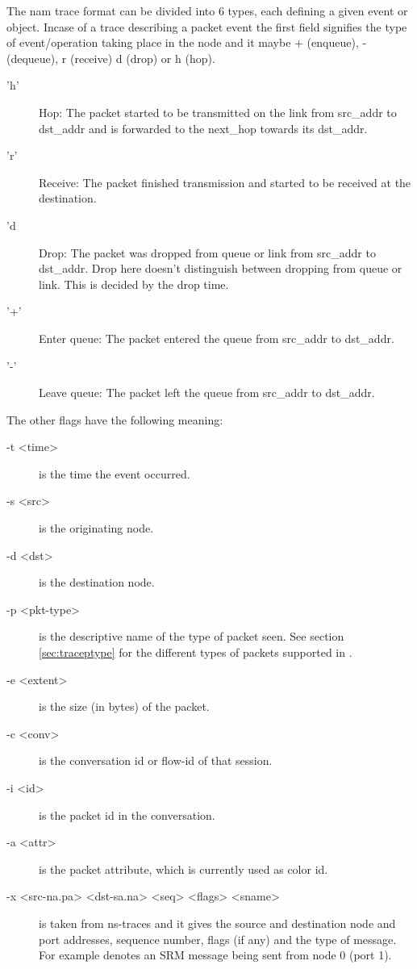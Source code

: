 The nam trace format can be divided into 6 types, each defining a given
event or object. Incase of a trace
describing a packet event the first field signifies the type of
event/operation taking place in the node and it maybe + (enqueue), -
(dequeue), r (receive) d (drop) or h (hop).
\begin{description}
\item['h'] Hop: The packet started to be transmitted on the link from
src\_addr to dst\_addr and is forwarded to the next\_hop towards its
dst\_addr.

\item['r'] Receive: The packet finished transmission and started to be
received at the destination.

\item['d] Drop: The packet was dropped from queue or link from src\_addr
to dst\_addr. Drop here doesn't distinguish between dropping from queue or
link. This is decided by the drop time.  

\item['+'] Enter queue: The packet entered the queue from src\_addr to
dst\_addr.

\item['-'] Leave queue: The packet left the queue from src\_addr to
dst\_addr.  
\end{description}

The other flags have the following meaning:
\begin{description}
\item[-t <time>] is the time the event occurred.
\item[-s <src>] is the originating node.
\item[-d <dst>] is the destination node.
\item[-p <pkt-type>] is the descriptive name of the type of packet seen.
See section \ref{sec:traceptype} for the different types of packets 
supported in \ns.
\item[-e <extent>] is the size (in bytes) of the packet.
\item[-c <conv>] is the conversation id or flow-id of that session.
\item[-i <id>] is the packet id in the conversation.
\item[-a <attr>] is the packet attribute, which is currently used as color
id. 
\item[-x <src-na.pa> <dst-sa.na> <seq> <flags> <sname>] is taken from
ns-traces and it gives the source and destination node and port
addresses, sequence number, flags (if any) and the type of message.
For example  denotes an
SRM message being sent from node 0 (port 1).
\end{description}

